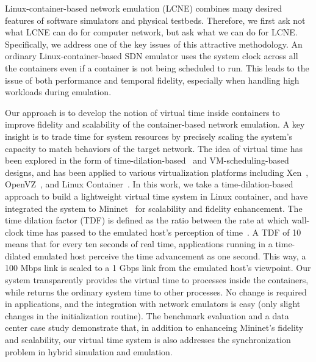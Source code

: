 \label{VT:Sec:Intro}

Linux-container-based network emulation (LCNE) combines many desired features of software simulators and physical testbeds.
Therefore, we first ask not what LCNE can do for computer network, but ask what we can do for LCNE.
Specifically, we address one of the key issues of this attractive methodology.
An ordinary Linux-container-based SDN emulator uses the system clock across all the containers even if a container is not being scheduled to run.
This leads to the issue of both performance and temporal fidelity, especially when handling high workloads during emulation.

Our approach is to develop the notion of virtual time inside containers to improve fidelity and scalability of the container-based network emulation.
A key insight is to trade time for system resources by precisely scaling the system's capacity to match behaviors of the target network.
The idea of virtual time has been explored in the form of time-dilation-based~\cite{ToInfinityBeyond} and
VM-scheduling-based~\cite{VirtTimeOpenVZ, SliceTime} designs, and has been applied to various virtualization platforms including Xen~\cite{DieCast},
OpenVZ~\cite{VirtTimeOpenVZ}, and Linux Container~\cite{TimeKeeper}.
In this work, we take a time-dilation-based approach to build a lightweight virtual time system in Linux container,
and have integrated the system to Mininet~\cite{Mininet} for scalability and fidelity enhancement.
The time dilation factor (TDF) is defined as the ratio between the rate at which wall-clock time has
passed to the emulated host's perception of time~\cite{ToInfinityBeyond}.
A TDF of 10 means that for every ten seconds of real time, applications running in a time-dilated emulated host perceive the time advancement as one second.
This way, a 100 Mbps link is scaled to a 1 Gbps link from the emulated host's viewpoint.
Our system transparently provides the virtual time to processes inside the containers,
while returns the ordinary system time to other processes.
No change is required in applications, and the integration with network emulators is easy (only slight changes in the initialization routine).
The benchmark evaluation and a data center case study demonstrate that, in addition to enhanceing Mininet's fidelity and scalability,
our virtual time system is also addresses the synchronization problem in hybrid simulation and emulation.

